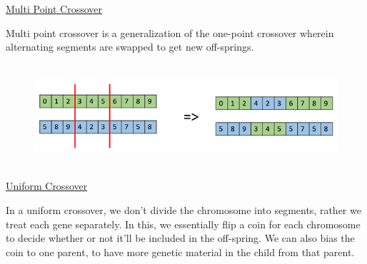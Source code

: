 \documentclass[12pt]{article}
\renewcommand{\_}{\kern-1.5pt\textunderscore\kern-1.5pt}
\begin{document}
\begin{enumerate}

\setlength{\parskip}{0.0pt}
\par

\setlength{\parskip}{7.2pt}
\begin{justify}
{\fontsize{14pt}{16.8pt}\selectfont \uline{Multi Point Crossover}\par}
\end{justify}\par

\begin{justify}
Multi point crossover is a generalization of the one-point crossover wherein alternating segments are swapped to get new off-springs.
\end{justify}\par




\begin{figure}[H]
	\begin{Center}
		\includegraphics[width=6.25in,height=1.49in]{./media/image13.png}
	\end{Center}
\end{figure}



\setlength{\parskip}{0.0pt}
\par

\setlength{\parskip}{7.2pt}
\begin{justify}
{\fontsize{14pt}{16.8pt}\selectfont \uline{Uniform Crossover}\par}
\end{justify}\par

\begin{justify}
In a uniform crossover, we don’t divide the chromosome into segments, rather we treat each gene separately. In this, we essentially flip a coin for each chromosome to decide whether or not it’ll be included in the off-spring. We can also bias the coin to one parent, to have more genetic material in the child from that parent.
\end{justify}\par




\end{enumerate}
\end{document}
